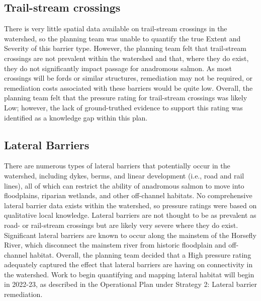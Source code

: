 \documentclass[
  letterpaper,
  DIV=11,
  numbers=noendperiod]{scrreprt}
\begin{document}
\hypertarget{trail-stream-crossings}{%
\subsection*{Trail-stream crossings}\label{trail-stream-crossings}}

There is very little spatial data available on trail-stream crossings in
the watershed, so the planning team was unable to quantify the true
Extent and Severity of this barrier type. However, the planning team
felt that trail-stream crossings are not prevalent within the watershed
and that, where they do exist, they do not significantly impact passage
for anadromous salmon. As most crossings will be fords or similar
structures, remediation may not be required, or remediation costs
associated with these barriers would be quite low. Overall, the planning
team felt that the pressure rating for trail-stream crossings was likely
Low; however, the lack of ground-truthed evidence to support this rating
was identified as a knowledge gap within this plan.

\hypertarget{lateral-barriers}{%
\subsection*{Lateral Barriers}\label{lateral-barriers}}

There are numerous types of lateral barriers that potentially occur in
the watershed, including dykes, berms, and linear development (i.e.,
road and rail lines), all of which can restrict the ability of
anadromous salmon to move into floodplains, riparian wetlands, and other
off-channel habitats. No comprehensive lateral barrier data exists
within the watershed, so pressure ratings were based on qualitative
local knowledge. Lateral barriers are not thought to be as prevalent as
road- or rail-stream crossings but are likely very severe where they do
exist. Significant lateral barriers are known to occur along the
mainstem of the Horsefly River, which disconnect the mainstem river from
historic floodplain and off-channel habitat. Overall, the planning team
decided that a High pressure rating adequately captured the effect that
lateral barriers are having on connectivity in the watershed. Work to
begin quantifying and mapping lateral habitat will begin in 2022-23, as
described in the Operational Plan under Strategy 2: Lateral barrier
remediation.
\end{document}
